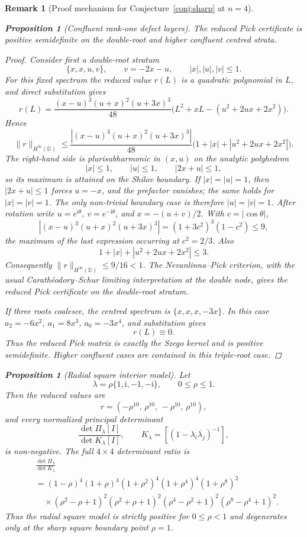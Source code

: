 \documentclass[11pt]{article}
\newtheorem{proposition}[theorem]{Proposition}
\newtheorem{remark}[theorem]{Remark}
\numberwithin{equation}{section}
\newcommand{\bbD}{\mathbb D}
\newcommand{\ii}{\mathrm i}
\begin{document}
\begin{remark}[Proof mechanism for Conjecture~\ref{conj:sharp} at $n=4$]
\begin{proposition}[Confluent rank-one defect layers]\label{prop:confluent-layers}
The reduced Pick certificate is positive semidefinite on the double-root and
higher confluent centred strata.
\end{proposition}

\begin{proof}
Consider first a double-root stratum
\[
  \{x,x,u,v\},\qquad v=-2x-u,\qquad |x|,|u|,|v|\le1.
\]
For this fixed spectrum the reduced value \(r(L)\) is a quadratic polynomial in
\(L\), and direct substitution gives
\[
  r(L)=\frac{(x-u)^3(u+x)^2(u+3x)^3}{48}
  \bigl(L^2+xL-(u^2+2ux+2x^2)\bigr).
\]
Hence
\[
  \|r\|_{H^\infty(\bbD)}
  \le
  \frac{|(x-u)^3(u+x)^2(u+3x)^3|}{48}
  \bigl(1+|x|+|u^2+2ux+2x^2|\bigr).
\]
The right-hand side is plurisubharmonic in \((x,u)\) on the analytic
polyhedron
\[
  |x|\le1,\qquad |u|\le1,\qquad |2x+u|\le1,
\]
so its maximum is attained on the Shilov boundary.  If \(|x|=|u|=1\), then
\(|2x+u|\le1\) forces \(u=-x\), and the prefactor vanishes; the same holds for
\(|x|=|v|=1\).  The only non-trivial boundary case is therefore
\(|u|=|v|=1\).  After rotation write \(u=e^{\ii\theta}\),
\(v=e^{-\ii\theta}\), and \(x=-(u+v)/2\).  With \(c=|\cos\theta|\),
\[
  |(x-u)^3(u+x)^2(u+3x)^3|
  =(1+3c^2)^3(1-c^2)\le9,
\]
the maximum of the last expression occurring at \(c^2=2/3\).  Also
\[
  1+|x|+|u^2+2ux+2x^2|\le3.
\]
Consequently \(\|r\|_{H^\infty(\bbD)}\le9/16<1\).  The Nevanlinna--Pick
criterion, with the usual Carathéodory--Schur limiting interpretation at the
double node, gives the reduced Pick certificate on the double-root stratum.

If three roots coalesce, the centred spectrum is \(\{x,x,x,-3x\}\).  In this
case \(a_2=-6x^2\), \(a_1=8x^3\), \(a_0=-3x^4\), and substitution gives
\[
  r(L)\equiv0.
\]
Thus the reduced Pick matrix is exactly the Szego kernel and is positive
semidefinite.  Higher confluent cases are contained in this triple-root case.
\end{proof}

\begin{proposition}[Radial square interior model]\label{prop:radial-square-model}
Let
\[
  \lambda=\rho\{1,\ii,-1,-\ii\},\qquad 0\le\rho\le1 .
\]
Then the reduced values are
\[
  r=(-\rho^{10},\,\rho^{10},\,-\rho^{10},\,\rho^{10}),
\]
and every normalized principal determinant
\[
  \frac{\det \Pi_\lambda[I]}{\det K_\lambda[I]},\qquad
  K_\lambda=\left[(1-\lambda_i\overline{\lambda_j})^{-1}\right],
\]
is non-negative.  The full \(4\times4\) determinant ratio is
\[
\begin{aligned}
&\frac{\det \Pi_\lambda}{\det K_\lambda}\\
&=(1-\rho)^4(1+\rho)^4(1+\rho^2)^4(1+\rho^4)^4(1+\rho^8)^2\\
&\quad\times(\rho^2-\rho+1)^2(\rho^2+\rho+1)^2
(\rho^4-\rho^2+1)^2(\rho^8-\rho^4+1)^2 .
\end{aligned}
\]
Thus the radial square model is strictly positive for \(0\le\rho<1\) and
degenerates only at the sharp square boundary point \(\rho=1\).
\end{proposition}


\end{remark}
\end{document}
